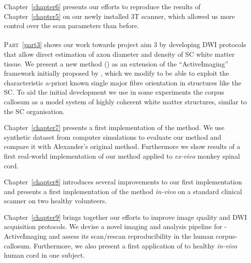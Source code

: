 Chapter~\ref{chapter6} presents our efforts to reproduce the results of Chapter~\ref{chapter5} on our newly installed 3T scanner, which allowed us more control over the scan parameters than before. 

\paragraph{}{\scshape{Part}}~{\protect\ref{part3}} shows our work towards project aim 3 by developing \gls{DWI} protocols that allow direct estimation of axon diameter and density of SC white matter tissue. We present a new method ({\SF}) as an extension of the ``ActiveImaging'' framework initially proposed by \citet{Alexander:2008}, which we modify to be able to exploit the characteristic a-priori known single major fibre orientation in structures like the \gls{SC}. To aid the initial development we use in some experiments the corpus callosum as a model system of highly coherent white matter structures, similar to the \gls{SC} organisation.

Chapter~\ref{chapter7} presents a first implementation of the {\SF} method. We use synthetic dataset from computer simulations to evaluate our method and compare it with Alexander's original method. Furthermore we show results of a first real-world implementation of our method applied to \emph{ex-vivo} monkey spinal cord.

Chapter~\ref{chapter8} introduces several improvements to our first {\SF} implementation and presents a first implementation of the {\SF} method \emph{in-vivo} on a standard clinical scanner on two healthy volunteers. 

Chapter~\ref{chapter9} brings together our efforts to improve image quality and \gls{DWI} acquisition protocols. We devise a novel imaging and analysis pipeline for  {\SF}-ActiveImaging and assess its scan/rescan reproducibility in the human corpus-callosum. Furthermore, we also present a first application of {\SF} to healthy \emph{in-vivo} human cord in one subject.

 
 
